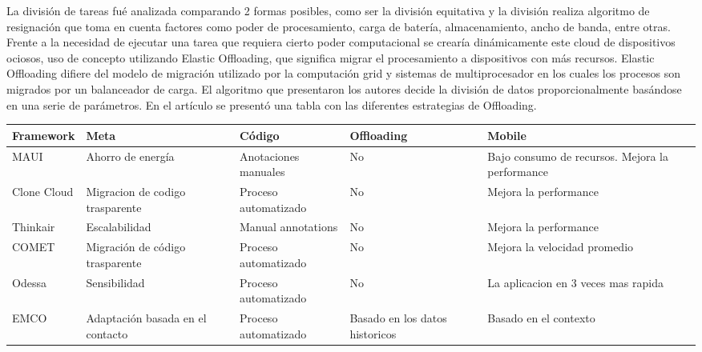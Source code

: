 La división de tareas fué analizada comparando 2 formas posibles, como ser la división equitativa y la división realiza algoritmo de resignación que toma en cuenta factores como poder de procesamiento, carga de batería,
almacenamiento, ancho de banda, entre otras.
Frente a la necesidad de ejecutar una tarea que requiera cierto poder computacional se crearía dinámicamente este cloud de dispositivos ociosos,
uso de concepto utilizando Elastic Offloading, que significa migrar el procesamiento a dispositivos con más recursos.
Elastic Offloading difiere del modelo de migración utilizado por la computación grid y sistemas de multiprocesador en los cuales los procesos son migrados por un balanceador de carga. El algoritmo que presentaron los autores decide la división de datos proporcionalmente basándose en una serie de parámetros.
En el artículo se presentó una tabla con las diferentes estrategias de Offloading.
\begin{table}[t]
    \begin{center}
        \begin{tabular}{ | m{2cm} | m{} | m{} | m{2cm} | m{} |}
            \hline
            Framework   & Meta                             & Código               & Offloading                     & Mobile                                          \\ \hline
            MAUI        & Ahorro de energía                & Anotaciones manuales & No                             & Bajo consumo de recursos. Mejora la performance \\ \hline
            Clone Cloud & Migracion de codigo trasparente  & Proceso automatizado & No                             & Mejora la performance                           \\ \hline
            Thinkair    & Escalabilidad                    & Manual annotations   & No                             & Mejora la performance                           \\ \hline
            COMET       & Migración de código trasparente  & Proceso automatizado & No                             & Mejora la velocidad promedio                    \\ \hline
            Odessa      & Sensibilidad                     & Proceso automatizado & No                             & La aplicacion en 3 veces mas rapida             \\ \hline
            EMCO        & Adaptación basada en el contacto & Proceso automatizado & Basado en los datos historicos & Basado en el contexto                           \\ \hline
        \end{tabular}
    \end{center}
\end{table}
